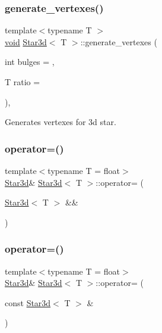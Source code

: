 \subsubsection{\texorpdfstring{generate\+\_\+vertexes()}{generate\_vertexes()}}
{\footnotesize\ttfamily template$<$typename T $>$ \\
\mbox{\hyperlink{glad_8h_a950fc91edb4504f62f1c577bf4727c29}{void}} \mbox{\hyperlink{classStar3d}{Star3d}}$<$ T $>$\+::generate\+\_\+vertexes (\begin{DoxyParamCaption}\item[{int}]{bulges = {},  }\item[{T}]{ratio = {} }\end{DoxyParamCaption})\hspace{0.3cm}{\ttfamily [inline]}, {\ttfamily [private]}}



Generates vertexes for 3d star. 

\mbox{\label{classStar3d_a35ace37c66d10033bef1d0acaf9f3283}} 
\subsubsection{\texorpdfstring{operator=()}{operator=()}\hspace{0.1cm}{\footnotesize\ttfamily [1/2]}}
{\footnotesize\ttfamily template$<$typename T  = float$>$ \\
\mbox{\hyperlink{classStar3d}{Star3d}}\& \mbox{\hyperlink{classStar3d}{Star3d}}$<$ T $>$\+::operator= (\begin{DoxyParamCaption}\item[{\mbox{\hyperlink{classStar3d}{Star3d}}$<$ T $>$ \&\&}]{ }\end{DoxyParamCaption})\hspace{0.3cm}{\ttfamily [default]}}

\mbox{\label{classStar3d_a6e1939003aedebc06efdb51404dfbadd}} 
\subsubsection{\texorpdfstring{operator=()}{operator=()}\hspace{0.1cm}{\footnotesize\ttfamily [2/2]}}
{\footnotesize\ttfamily template$<$typename T  = float$>$ \\
\mbox{\hyperlink{classStar3d}{Star3d}}\& \mbox{\hyperlink{classStar3d}{Star3d}}$<$ T $>$\+::operator= (\begin{DoxyParamCaption}\item[{const \mbox{\hyperlink{classStar3d}{Star3d}}$<$ T $>$ \&}]{ }\end{DoxyParamCaption})\hspace{0.3cm}{\ttfamily [default]}}

